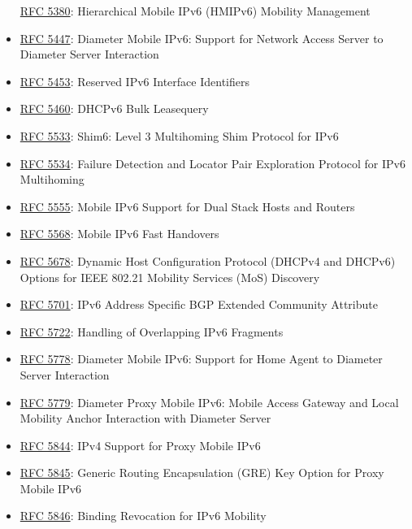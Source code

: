 \documentclass[
]{article}
\begin{document}
\begin{itemize}
  \href{https://www.rfc-editor.org/info/rfc5380}{RFC 5380}: Hierarchical
  Mobile IPv6 (HMIPv6) Mobility Management
\item
  \href{https://www.rfc-editor.org/info/rfc5447}{RFC 5447}: Diameter
  Mobile IPv6: Support for Network Access Server to Diameter Server
  Interaction
\item
  \href{https://www.rfc-editor.org/info/rfc5453}{RFC 5453}: Reserved
  IPv6 Interface Identifiers
\item
  \href{https://www.rfc-editor.org/info/rfc5460}{RFC 5460}: DHCPv6 Bulk
  Leasequery
\item
  \href{https://www.rfc-editor.org/info/rfc5533}{RFC 5533}: Shim6: Level
  3 Multihoming Shim Protocol for IPv6
\item
  \href{https://www.rfc-editor.org/info/rfc5534}{RFC 5534}: Failure
  Detection and Locator Pair Exploration Protocol for IPv6 Multihoming
\item
  \href{https://www.rfc-editor.org/info/rfc5555}{RFC 5555}: Mobile IPv6
  Support for Dual Stack Hosts and Routers
\item
  \href{https://www.rfc-editor.org/info/rfc5568}{RFC 5568}: Mobile IPv6
  Fast Handovers
\item
  \href{https://www.rfc-editor.org/info/rfc5678}{RFC 5678}: Dynamic Host
  Configuration Protocol (DHCPv4 and DHCPv6) Options for IEEE 802.21
  Mobility Services (MoS) Discovery
\item
  \href{https://www.rfc-editor.org/info/rfc5701}{RFC 5701}: IPv6 Address
  Specific BGP Extended Community Attribute
\item
  \href{https://www.rfc-editor.org/info/rfc5722}{RFC 5722}: Handling of
  Overlapping IPv6 Fragments
\item
  \href{https://www.rfc-editor.org/info/rfc5778}{RFC 5778}: Diameter
  Mobile IPv6: Support for Home Agent to Diameter Server Interaction
\item
  \href{https://www.rfc-editor.org/info/rfc5779}{RFC 5779}: Diameter
  Proxy Mobile IPv6: Mobile Access Gateway and Local Mobility Anchor
  Interaction with Diameter Server
\item
  \href{https://www.rfc-editor.org/info/rfc5844}{RFC 5844}: IPv4 Support
  for Proxy Mobile IPv6
\item
  \href{https://www.rfc-editor.org/info/rfc5845}{RFC 5845}: Generic
  Routing Encapsulation (GRE) Key Option for Proxy Mobile IPv6
\item
  \href{https://www.rfc-editor.org/info/rfc5846}{RFC 5846}: Binding
  Revocation for IPv6 Mobility

\end{itemize}
\end{document}
